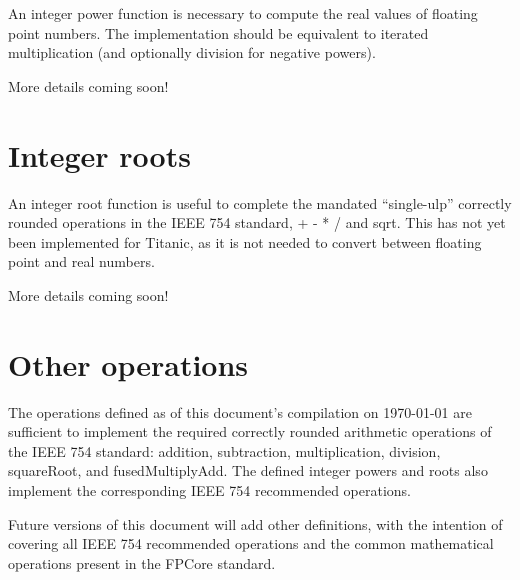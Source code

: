 \documentclass[letterpaper,10pt]{article}
\begin{document}
An integer power function is necessary to compute the real values of floating point numbers. The implementation should be equivalent to iterated multiplication (and optionally division for negative powers).

More details coming soon!

\section{Integer roots}

An integer root function is useful to complete the mandated ``single-ulp'' correctly rounded operations in the IEEE 754 standard, + - * / and sqrt. This has not yet been implemented for Titanic, as it is not needed to convert between floating point and real numbers.

More details coming soon!

\section{Other operations}

The operations defined as of this document's compilation on \today\; are sufficient to implement the required correctly rounded arithmetic operations of the IEEE 754 standard: addition, subtraction, multiplication, division, squareRoot, and fusedMultiplyAdd. The defined integer powers and roots also implement the corresponding IEEE 754 recommended operations.

Future versions of this document will add other definitions, with the intention of covering all IEEE 754 recommended operations and the common mathematical operations present in the FPCore standard.

%
%
\end{document}
